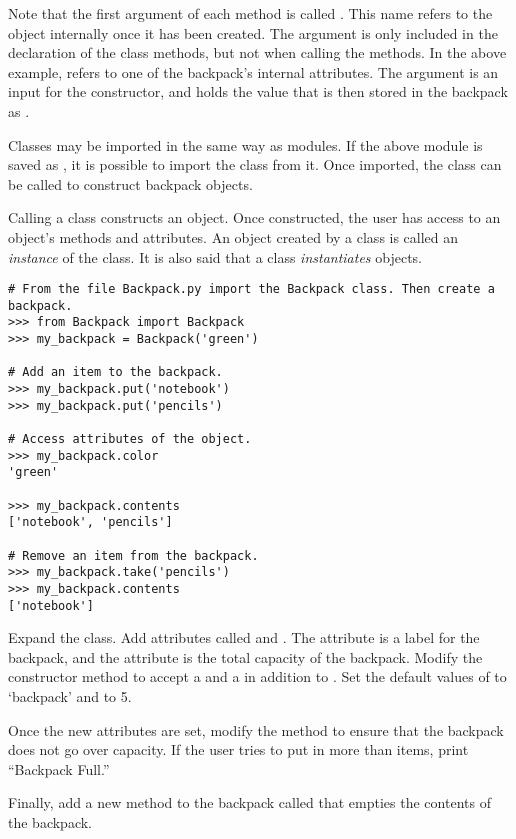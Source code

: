Note that the first argument of each method is called .
This name refers to the object internally once it has been created.
The  argument is only included in the declaration of the class methods, but not when calling the methods.
In the above example,  refers to one of the backpack's internal attributes.
The argument  is an input for the constructor, and holds the value that is then stored in the backpack as .

Classes may be imported in the same way as modules.
If the above module is saved as , it is possible to import the  class from it.
Once imported, the  class can be called to construct backpack objects.

Calling a class constructs an object.
Once constructed, the user has access to an object's methods and attributes.
An object created by a class is called an \emph{instance} of the class.
It is also said that a class \emph{instantiates} objects.
\begin{lstlisting}
# From the file Backpack.py import the Backpack class. Then create a backpack.
>>> from Backpack import Backpack
>>> my_backpack = Backpack('green')

# Add an item to the backpack.
>>> my_backpack.put('notebook')
>>> my_backpack.put('pencils')

# Access attributes of the object.
>>> my_backpack.color
'green'

>>> my_backpack.contents
['notebook', 'pencils']

# Remove an item from the backpack.
>>> my_backpack.take('pencils')
>>> my_backpack.contents
['notebook']
\end{lstlisting}

\begin{problem}
Expand the  class.
Add attributes called  and .
The  attribute is a label for the backpack, and the  attribute is the total capacity of the backpack.
Modify the constructor method to accept a  and a  in addition to .
Set the default values of  to `backpack' and  to 5.

Once the new attributes are set, modify the  method to ensure that the backpack does not go over capacity.
If the user tries to put in more than  items, print ``Backpack Full.''

Finally, add a new method to the backpack called  that empties the contents of the backpack.
\end{problem}

